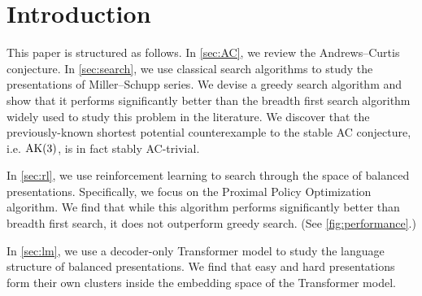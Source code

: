 
\section{Introduction\label{sec:intro}}

This paper is structured as follows. In \autoref{sec:AC}, we review the Andrews--Curtis conjecture. In \autoref{sec:search}, we use classical search algorithms to study the presentations of Miller--Schupp series. We devise a greedy search algorithm and show that it performs significantly better than the breadth first search algorithm widely used to study this problem in the literature. We discover that the previously-known shortest potential counterexample to the stable AC conjecture, i.e. $\text{AK}(3)$, is in fact stably AC-trivial.
\newline

In \autoref{sec:rl}, we use reinforcement learning to search through the space of balanced presentations. Specifically, we focus on the Proximal Policy Optimization algorithm. We find that while this algorithm performs significantly better than breadth first search, it does not outperform greedy search. (See \autoref{fig:performance}.)
\newline

In \autoref{sec:lm}, we use a decoder-only Transformer model to study the language structure of balanced presentations. We find that easy and hard presentations form their own clusters inside the embedding space of the Transformer model.


